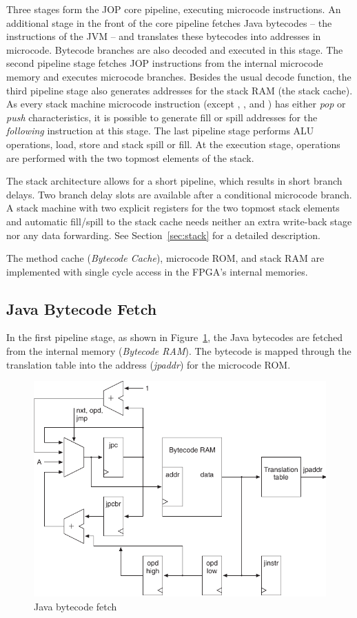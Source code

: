 Three stages form the JOP core pipeline, executing microcode
instructions. An additional stage in the front of the core pipeline
fetches Java bytecodes -- the instructions of the JVM -- and
translates these bytecodes into addresses in microcode. Bytecode
branches are also decoded and executed in this stage. The second
pipeline stage fetches JOP instructions from the internal microcode
memory and executes microcode branches. Besides the usual decode
function, the third pipeline stage also generates addresses for the
stack RAM (the stack cache). As every stack machine microcode
instruction (except , , and ) has
either \emph{pop} or \emph{push} characteristics, it is possible to
generate fill or spill addresses for the \emph{following}
instruction at this stage. The last pipeline stage performs ALU
operations, load, store and stack spill or fill. At the execution
stage, operations are performed with the two topmost elements of the
stack.

The stack architecture allows for a short pipeline, which results in
short branch delays. Two branch delay slots are available after a
conditional microcode branch. A stack machine with two explicit
registers for the two topmost stack elements and automatic
fill/spill to the stack cache needs neither an extra write-back
stage nor any data forwarding. See Section~\ref{sec:stack} for a
detailed description.

The method cache (\emph{Bytecode Cache}), microcode ROM, and stack
RAM are implemented with single cycle access in the FPGA's internal
memories.


\subsection{Java Bytecode Fetch}

In the first pipeline stage, as shown in
Figure~\ref{fig_arch_bc_fetch}, the Java bytecodes are fetched from
the internal memory (\emph{Bytecode RAM}). The bytecode is mapped
through the translation table into the address (\emph{jpaddr}) for
the microcode ROM.

\begin{figure}
    \centering
    \includegraphics[scale=\picscale]{arch/arch_bcfetch}
    \caption{Java bytecode fetch}
    \label{fig_arch_bc_fetch}
\end{figure}

